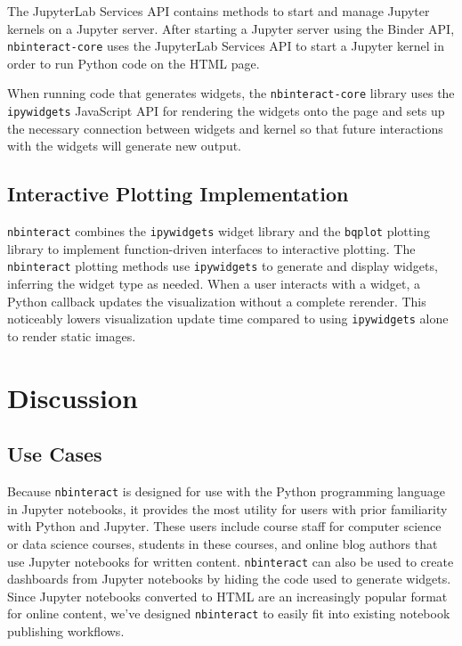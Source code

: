 \documentclass[nobib]{tufte-handout}
\newcommand{\code}[1]{\texttt{#1}}
\begin{document}
The JupyterLab Services API contains methods to start and manage Jupyter
kernels on a Jupyter server. After
starting a Jupyter server using the Binder API, \code{nbinteract-core} uses the
JupyterLab Services API to start a Jupyter kernel in order to run Python code
on the HTML page.

When running code that generates widgets, the \code{nbinteract-core} library
uses the \code{ipywidgets} JavaScript API for rendering the widgets onto the
page and sets up
the necessary connection between widgets and kernel so that future interactions
with the widgets will generate new output.


\subsection{Interactive Plotting Implementation} %
\label{sub:interactive_plotting_implementation}

\code{nbinteract} combines the \code{ipywidgets} widget library and the
\code{bqplot} plotting
library to implement function-driven interfaces to interactive plotting. The
\code{nbinteract} plotting methods use \code{ipywidgets} to generate and
display widgets, inferring the widget type as needed. When a user interacts
with a widget, a Python callback updates the visualization without a complete
rerender. This noticeably lowers visualization update time compared to using
\code{ipywidgets} alone to render static images.



\section{Discussion} %
\label{sec:discussion}

\subsection{Use Cases} %
\label{sub:use_cases}

Because \code{nbinteract} is designed for use with the Python programming
language in Jupyter notebooks, it provides the most utility for users with
prior familiarity with Python and Jupyter. These users include course staff for
computer science or data science courses, students in these courses, and online
blog authors that use Jupyter notebooks for written content. \code{nbinteract}
can also be used to create dashboards from Jupyter notebooks by hiding the
code used to generate widgets. Since Jupyter notebooks converted to HTML are an
increasingly popular format for online content, we've designed \code{nbinteract}
to easily fit into existing notebook publishing workflows.
\end{document}
